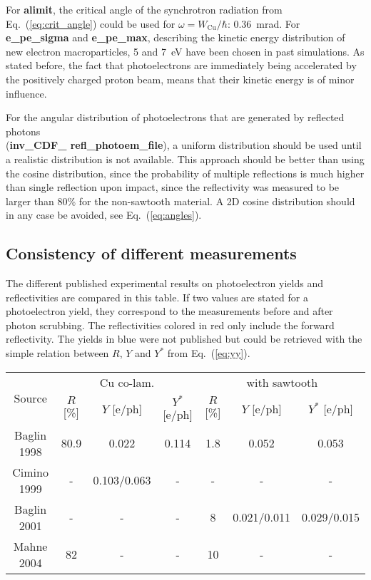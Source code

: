 For \textbf{alimit}, the critical angle of the synchrotron radiation from Eq.~(\ref{eq:crit_angle}) could be used for $\omega = W_\text{Cu}/\hbar$: 0.36~mrad.
For \textbf{e\_pe\_sigma} and \textbf{e\_pe\_max}, describing the kinetic energy distribution of new electron macroparticles, 5 and 7~eV have been chosen in past simulations.
As stated before, the fact that photoelectrons are immediately being accelerated by the positively charged proton beam, means that their kinetic energy is of minor influence.

For the angular distribution of photoelectrons that are generated by reflected photons
\\
(\textbf{inv\_CDF\_ refl\_photoem\_file}), a uniform distribution should be used until a realistic distribution is not available.
This approach should be better than using the cosine distribution, since the probability of multiple reflections is much higher than single reflection upon impact, since the reflectivity was measured to be larger than 80\% for the non-sawtooth material.
A 2D cosine distribution should in any case be avoided, see Eq.~(\ref{eq:angles}).


\subsection{Consistency of different measurements}

The different published experimental results on photoelectron yields and reflectivities are compared in this table.
If two values are stated for a photoelectron yield, they correspond to the measurements before and after photon scrubbing.
The reflectivities colored in red only include the forward reflectivity.
The yields in blue were not published but could be retrieved with the simple relation between $R$, $Y$ and $Y^*$ from Eq.~(\ref{eq:yy}).
\begin{center}
    \begin{tabular}{c|ccc|ccc}
        \multirow{2}{*}{Source} & \multicolumn{3}{c|}{Cu co-lam.} & \multicolumn{3}{|c}{with sawtooth} \\
        & $R$ [\%] & $Y$ [e/ph]& $Y^*$ [e/ph]& $R$ [\%]& $Y$ [e/ph]& $Y^*$ [e/ph] \\\hline
        Baglin 1998 & {\color{red}80.9} & {\color{blue}0.022} & 0.114 & {\color{red}1.8} & {\color{blue} 0.052} & 0.053 \\
        Cimino 1999 & - & 0.103/0.063 & - & - & - & - \\
        Baglin 2001 & - & - & - & {\color{red}8} & {\color{blue}0.021/0.011} & 0.029/0.015 \\
        Mahne 2004 & 82 & - & - & 10 & - & - \\
    \end{tabular}
\end{center}

